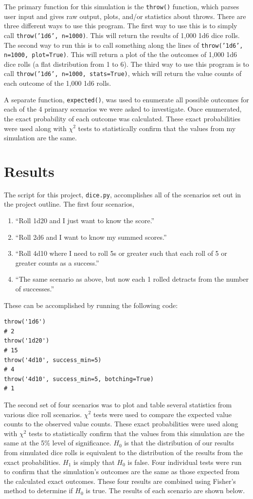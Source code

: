 \documentclass{article}
\begin{document}
The primary function for this simulation is the \texttt{throw()} function, which parses user input and gives raw output, plots, and/or statistics about throws. There are three different ways to use this program. The first way to use this is to simply call \texttt{throw('1d6', n=1000)}. This will return the results of 1,000 1d6 dice rolls. The second way to run this is to call something along the lines of \texttt{throw('1d6', n=1000, plot=True)}. This will return a plot of the the outcomes of 1,000 1d6 dice rolls (a flat distribution from 1 to 6). The third way to use this program is to call \texttt{throw('1d6', n=1000, stats=True)}, which will return the value counts of each outcome of the 1,000 1d6 rolls.

A separate function, \texttt{expected()}, was used to enumerate all possible outcomes for each of the 4 primary scenarios we were asked to investigate. Once enumerated, the exact probability of each outcome was calculated. These exact probabilities were used along with $\chi^2$ tests to statistically confirm that the values from my simulation are the same.

\section{Results}
The script for this project, \texttt{dice.py}, accomplishes all of the scenarios set out in the project outline. The first four scenarios,
\begin{enumerate}
\itemsep-.25em
\item ``Roll 1d20 and I just want to know the score.''
\item ``Roll 2d6 and I want to know my summed scores.''
\item ``Roll 4d10 where I need to roll 5s or greater such that each roll of 5 or greater counts as a success.''
\item ``The same scenario as above, but now each 1 rolled detracts from the number of successes.''
\end{enumerate}
\noindent These can be accomplished by running the following code:
\begin{lstlisting}
throw('1d6')
# 2
throw('1d20')
# 15
throw('4d10', success_min=5)
# 4
throw('4d10', success_min=5, botching=True)
# 1
\end{lstlisting}
The second set of four scenarios was to plot and table several statistics from various dice roll scenarios. $\chi^2$ tests were used to compare the expected value counts to the observed value counts. These exact probabilities were used along with $\chi^2$ tests to statistically confirm that the values from this simulation are the same at the 5\% level of significance. $H_0$ is that the distribution of our results from simulated dice rolls is equivalent to the distribution of the results from the exact probabilities. $H_1$ is simply that $H_0$ is false. Four individual tests were run to confirm that the simulation's outcomes are the same as those expected from the calculated exact outcomes. These four results are combined using Fisher's method to determine if $H_0$ is true. The results of each scenario are shown below.
\end{document}
